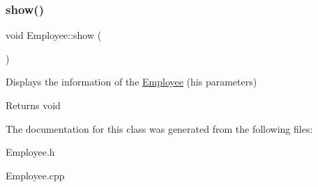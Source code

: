\subsubsection{\texorpdfstring{show()}{show()}}
{\footnotesize\ttfamily void Employee\+::show (\begin{DoxyParamCaption}{ }\end{DoxyParamCaption})}



Displays the information of the \hyperlink{class_employee}{Employee} (his parameters) 

\begin{DoxyReturn}{Returns}
void 
\end{DoxyReturn}


The documentation for this class was generated from the following files\+:\begin{DoxyCompactItemize}
\item 
Employee.\+h\item 
Employee.\+cpp\end{DoxyCompactItemize}
